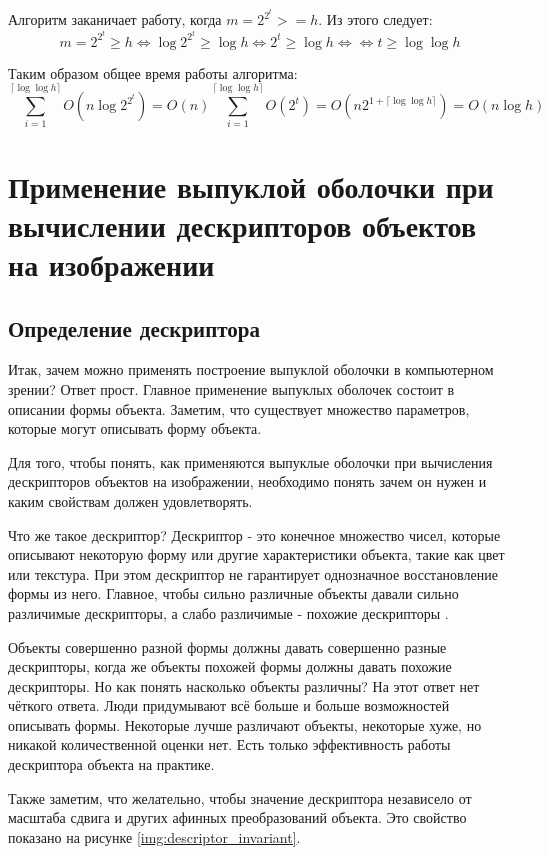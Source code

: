 Алгоритм заканичает работу, когда $m = 2^{2^t} >= h$. Из этого следует:
\[
m = 2^{2^t} \geq h \iff \log 2^{2^t} \geq \log h \iff 2^t \geq \log h \iff \iff t \geq \log \log h
\]

Таким образом общее время работы алгоритма:
\[
\sum_{i=1}^{\lceil \log \log h \rceil} O(n \log 2^{2^t}) = O(n) \sum_{i=1}^{\lceil \log \log h \rceil} O(2^t) = O(n 2^{1+\lceil \log \log h \rceil}) = O(n \log h)
\]

\section{Применение выпуклой оболочки при вычислении дескрипторов объектов на изображении}

\subsection{Определение дескриптора}

Итак, зачем можно применять построение выпуклой оболочки в компьютерном зрении? Ответ прост. Главное применение выпуклых оболочек состоит в описании формы объекта. Заметим, что существует множество параметров, которые могут описывать форму объекта.

Для того, чтобы понять, как применяются выпуклые оболочки при вычисления дескрипторов объектов на изображении, необходимо понять зачем он нужен и каким свойствам должен удовлетворять.

Что же такое дескриптор? Дескриптор - это конечное множество чисел, которые описывают некоторую форму или другие характеристики объекта, такие как цвет или текстура. При этом дескриптор не гарантирует однозначное восстановление формы из него. Главное, чтобы сильно различные объекты давали сильно различимые дескрипторы, а слабо различимые - похожие дескрипторы \cite{morse2000lecture}.

Объекты совершенно разной формы должны давать совершенно разные дескрипторы, когда же объекты похожей формы должны давать похожие дескрипторы. Но как понять насколько объекты различны? На этот ответ нет чёткого ответа. Люди придумывают всё больше и больше возможностей описывать формы. Некоторые лучше различают объекты, некоторые хуже, но никакой количественной оценки нет. Есть только эффективность работы дескриптора объекта на практике.

Также заметим, что желательно, чтобы значение дескриптора независело от масштаба сдвига и других афинных преобразований объекта\cite{azadeh2013lecture}. Это свойство показано на рисунке \ref{img:descriptor_invariant}.

